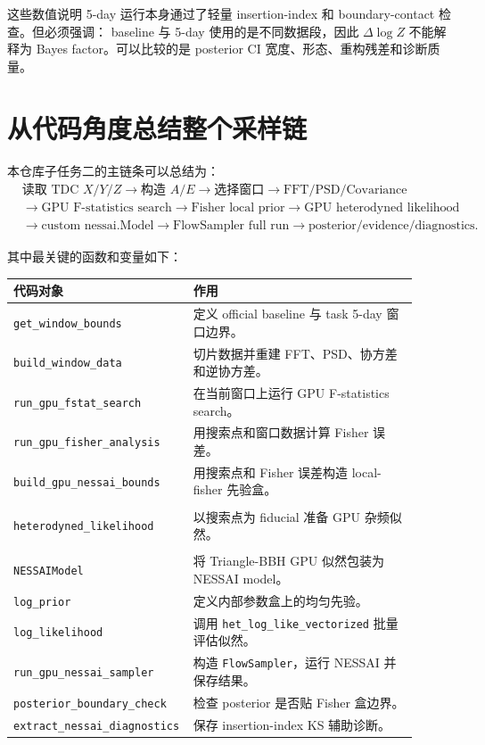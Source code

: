 \documentclass[11pt,a4paper]{ctexart}
\begin{document}
这些数值说明 5-day 运行本身通过了轻量 insertion-index 和 boundary-contact 检查。但必须强调：
baseline 与 5-day 使用的是不同数据段，因此 \(\Delta\log Z\) 不能解释为 Bayes factor。可以比较的是
posterior CI 宽度、形态、重构残差和诊断质量。

\section{从代码角度总结整个采样链}

本仓库子任务二的主链条可以总结为：
\[
\begin{aligned}
&\text{读取 TDC }X/Y/Z
\rightarrow \text{构造 }A/E
\rightarrow \text{选择窗口}
\rightarrow \text{FFT/PSD/Covariance} \\
&\rightarrow \text{GPU F-statistics search}
\rightarrow \text{Fisher local prior}
\rightarrow \text{GPU heterodyned likelihood} \\
&\rightarrow \text{custom nessai.Model}
\rightarrow \text{FlowSampler full run}
\rightarrow \text{posterior/evidence/diagnostics}.
\end{aligned}
\]

其中最关键的函数和变量如下：
\begin{longtable}{p{0.35\linewidth}p{0.55\linewidth}}
\toprule
代码对象 & 作用 \\
\midrule
\texttt{get\_window\_bounds} & 定义 official baseline 与 task 5-day 窗口边界。 \\
\texttt{build\_window\_data} & 切片数据并重建 FFT、PSD、协方差和逆协方差。 \\
\texttt{run\_gpu\_fstat\_search} & 在当前窗口上运行 GPU F-statistics search。 \\
\texttt{run\_gpu\_fisher\_analysis} & 用搜索点和窗口数据计算 Fisher 误差。 \\
\texttt{build\_gpu\_nessai\_bounds} & 用搜索点和 Fisher 误差构造 local-fisher 先验盒。 \\
\begin{tabular}[t]{@{}l@{}}\texttt{build\_gpu\_}\\\texttt{heterodyned\_likelihood}\end{tabular}
& 以搜索点为 fiducial 准备 GPU 杂频似然。 \\
\begin{tabular}[t]{@{}l@{}}\texttt{TaijiGPUHeterodyned}\\\texttt{NESSAIModel}\end{tabular}
& 将 Triangle-BBH GPU 似然包装为 NESSAI model。 \\
\texttt{log\_prior} & 定义内部参数盒上的均匀先验。 \\
\texttt{log\_likelihood} & 调用 \texttt{het\_log\_like\_vectorized} 批量评估似然。 \\
\texttt{run\_gpu\_nessai\_sampler} & 构造 \texttt{FlowSampler}，运行 NESSAI 并保存结果。 \\
\texttt{posterior\_boundary\_check} & 检查 posterior 是否贴 Fisher 盒边界。 \\
\texttt{extract\_nessai\_diagnostics} & 保存 insertion-index KS 辅助诊断。 \\
\bottomrule
\end{longtable}
\end{document}
